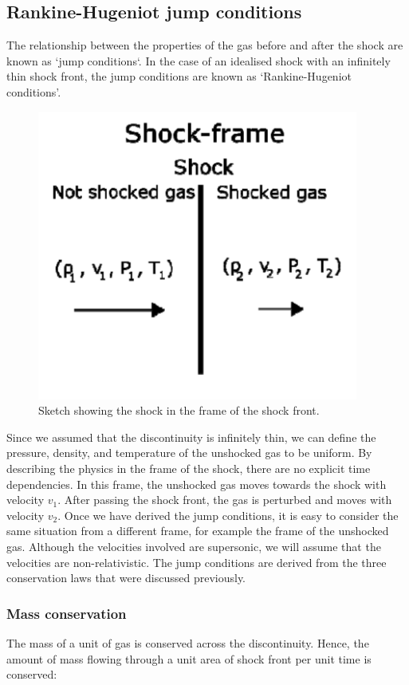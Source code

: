 \subsection{Rankine-Hugeniot jump conditions}
The relationship between the properties of the gas before and after the shock are known as `jump conditions`.
 In the case of an idealised shock with an infinitely thin shock front, the jump conditions are known as `Rankine-Hugeniot conditions'.
\par 
%
\begin{minipage}{0.27\textwidth}
	\begin{figure}[H]
		\includegraphics[width = \linewidth]{astro-processes/jump_conditions}
		\caption{Sketch showing the shock in the frame of the shock front.}
		\label{fig:AP:jump_conditions}
	\end{figure}
\end{minipage}
%
\begin{minipage}{0.67\textwidth}
	Since we assumed that the discontinuity is infinitely thin, we can define the pressure, density, and temperature of the unshocked gas to be uniform.
	 By describing the physics in the frame of the shock, there are no explicit time dependencies.
	 In this frame, the unshocked gas moves towards the shock with velocity \(v_1\).
	 After passing the shock front, the gas is perturbed and moves with velocity \(v_2\).
	 Once we have derived the jump conditions, it is easy to consider the same situation from a different frame, for example the frame of the unshocked gas.
	 Although the velocities involved are supersonic, we will assume that the velocities are non-relativistic.
	 The jump conditions are derived from the three conservation laws that were discussed previously.
\end{minipage}
%
\par 

\subsubsection{Mass conservation}
The mass of a unit of gas is conserved across the discontinuity.
 Hence, the amount of mass flowing through a unit area of shock front per unit time is conserved:





